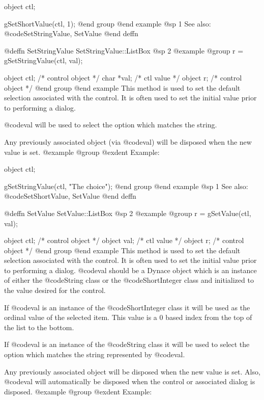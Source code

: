 {object  ctl;

gSetShortValue(ctl, 1);
@end group
@end example
@sp 1
See also:  @code{SetStringValue, SetValue}
@end deffn









@deffn {SetStringValue} SetStringValue::ListBox
@sp 2
@example
@group
r = gSetStringValue(ctl, val);

object  ctl;    /*  control object  */
char    *val;   /*  ctl value       */
object  r;      /*  control object  */
@end group
@end example
This method is used to set the default selection associated with the
control.  It is often used to set the initial value prior to performing
a dialog.  

@code{val} will be used to select the option which matches the string.

Any previously associated object (via @code{val}) will be disposed when
the new value is set.  
@example
@group
@exdent Example:

object  ctl;

gSetStringValue(ctl, "The choice");
@end group
@end example
@sp 1
See also:  @code{SetShortValue, SetValue}
@end deffn










@deffn {SetValue} SetValue::ListBox
@sp 2
@example
@group
r = gSetValue(ctl, val);

object  ctl;    /*  control object  */
object  val;    /*  ctl value       */
object  r;      /*  control object  */
@end group
@end example
This method is used to set the default selection associated with the
control.  It is often used to set the initial value prior to performing
a dialog.  @code{val} should be a Dynace object which is an instance of
either the @code{String} class or the @code{ShortInteger} class and
initialized to the value desired for the control.

If @code{val} is an instance of the @code{ShortInteger} class it will be
used as the ordinal value of the selected item.  This value is a 0 based
index from the top of the list to the bottom.

If @code{val} is an instance of the @code{String} class it will be used
to select the option which matches the string represented by @code{val}.

Any previously associated object will be disposed when the new value is set.
Also, @code{val} will automatically be disposed when the control or associated
dialog is disposed.
@example
@group
@exdent Example:

}
